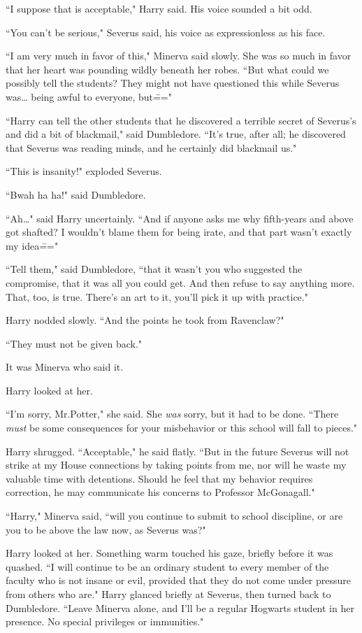 ``I suppose that is acceptable," Harry said. His voice sounded a bit odd.

``You can't be serious," Severus said, his voice as expressionless as his face.

``I am very much in favor of this," Minerva said slowly. She was so much in favor that her heart was pounding wildly beneath her robes. ``But what could we possibly tell the students? They might not have questioned this while Severus was{\ldots} being awful to everyone, but\==="

``Harry can tell the other students that he discovered a terrible secret of Severus's and did a bit of blackmail," said Dumbledore. ``It's true, after all; he discovered that Severus was reading minds, and he certainly did blackmail us."

``This is insanity!" exploded Severus.

``Bwah ha ha!" said Dumbledore.

``Ah{\ldots}" said Harry uncertainly. ``And if anyone asks me why fifth-years and above got shafted? I wouldn't blame them for being irate, and that part wasn't exactly my idea\==="

``Tell them," said Dumbledore, ``that it wasn't you who suggested the compromise, that it was all you could get. And then refuse to say anything more. That, too, is true. There's an art to it, you'll pick it up with practice."

Harry nodded slowly. ``And the points he took from Ravenclaw?"

``They must not be given back."

It was Minerva who said it.

Harry looked at her.

``I'm sorry, Mr.\?Potter," she said. She \emph{was} sorry, but it had to be done. ``There \emph{must} be some consequences for your misbehavior or this school will fall to pieces."

Harry shrugged. ``Acceptable," he said flatly. ``But in the future Severus will not strike at my House connections by taking points from me, nor will he waste my valuable time with detentions. Should he feel that my behavior requires correction, he may communicate his concerns to Professor McGonagall."

``Harry," Minerva said, ``will you continue to submit to school discipline, or are you to be above the law now, as Severus was?"

Harry looked at her. Something warm touched his gaze, briefly before it was quashed. ``I will continue to be an ordinary student to every member of the faculty who is not insane or evil, provided that they do not come under pressure from others who are." Harry glanced briefly at Severus, then turned back to Dumbledore. ``Leave Minerva alone, and I'll be a regular Hogwarts student in her presence. No special privileges or immunities."

